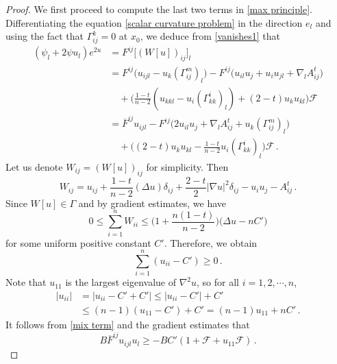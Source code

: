 \documentclass{article}
\theoremstyle{plain}
\theoremstyle{definition}
\theoremstyle{definition}
\numberwithin{equation}{section}
\begin{document}
\begin{sloppypar}
\begin{proof}
We first proceed to compute the last two terms in \eqref{max principle}. Differentiating the equation \eqref{scalar curvature problem} in the direction $e_l$ and using the fact that $\Gamma_{ij}^{k}=0$ at $x_0$, we deduce from \eqref{vanishes1} that
\begin{equation}\label{mix term}
\begin{split}
(\psi_{l}+2\psi u_{l})e^{2u}&=F^{ij}\big[(W[u])_{ij}\big]_{l}\\
&=F^{ij}\big(u_{ijl}-u_{k}(\Gamma_{ij}^{m})_{l} \big)-F^{ij}\big(u_{il}u_{j}+u_{i}u_{jl}+\nabla_{l}A^{t}_{ij}\big)\\
& \quad +\Big(\frac{1-t}{n-2}(u_{kkl}-u_{i}(\Gamma_{kk}^{i})_{l})+(2-t)u_{k} u_{kl}\Big)\mathcal{F}\\
&=\overline{F}^{ij}u_{ijl}-F^{ij}\big(2u_{il}u_{j}+\nabla_{l}A^{t}_{ij}+u_{k}(\Gamma_{ij}^{m})_{l}\big)\\
&\quad +\big((2-t)u_{k} u_{kl}-\frac{1-t}{n-2}u_{i}(\Gamma_{kk}^{i})_{l}\big)\mathcal{F}\,.
\end{split}
\end{equation}
Let us denote $W_{ij}=(W[u])_{ij}$ for simplicity. Then
\[
W_{ij}=u_{ij}+\frac{1-t}{n-2}(\Delta u)\delta_{ij}+\frac{2-t}{2}|\nabla u|^2\delta_{ij}-u_{i}u_{j}-A^{t}_{ij}\,.
\]
Since $W[u] \in \Gamma$ and by gradient estimates, we have
\[
0\leq \sum_{i=1}^{n}W_{ii}\leq \big(1+\frac{n(1-t)}{n-2}\big)\big(\Delta u-nC'\big)
\]
for some uniform positive constant $C'$. Therefore, we obtain
\[
\sum_{i=1}^{n}(u_{ii}-C')\geq 0\,.
\]
Note that $u_{11}$ is the largest eigenvalue of $\nabla^2u$, so for all $i=1,2,\cdots,n$,
\[
\begin{split}
|u_{ii}|&=|u_{ii}-C'+C'|\leq |u_{ii}-C'|+C'\\
&\leq  (n-1)(u_{11}-C')+C'=(n-1)u_{11}+nC'\,.
\end{split}
\]
It follows from \eqref{mix term} and the gradient estimates that
\begin{equation}
B\overline{F}^{ij}u_{ijl}u_{l}\geq -BC' (1+\mathcal{F}+u_{11}\mathcal{F} )\,.
\end{equation}


\end{proof}
\end{sloppypar}
\end{document}
